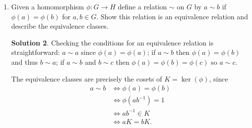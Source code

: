 \documentclass{article}
\theoremstyle{definition}
\newtheorem*{solution}{Solution}
\begin{document}
\begin{enumerate}
\begin{solution}
It is also a homomorphism, since 
\begin{align*}
\bar{\phi}((gH_1)(g'H_1)) &= \bar{\phi}(gg'H_1) \\
&= \phi(gg')H_2 \\
&= \phi(g)\phi(g')H_2 \\
&= (\phi(g)H_2)(\phi(g')H_2) \\
&= \bar{\phi}(gH_1) \bar{\phi}(g'H_1).
\end{align*}
\end{solution}
\item[11.19.] Given a homomorphism $\phi : G \to H$ define a relation $\sim$ on $G$ by $a \sim b$ if $\phi(a) = \phi(b)$ for $a, b \in G$.  Show this relation is an equivalence relation and describe the equivalence classes.
\begin{solution}
Checking the conditions for an equivalence relation is straightforward: $a \sim a$ since $\phi(a) = \phi(a)$; if $a \sim b$ then $\phi(a) = \phi(b)$ and thus $b \sim a$; if $a \sim b$ and $b \sim c$ then $\phi(a) = \phi(b) = \phi(c)$ so $a \sim c$.

The equivalence classes are precisely the cosets of $K = \ker(\phi)$, since
\begin{align*}
a \sim b &\Leftrightarrow \phi(a) = \phi(b) \\
&\Leftrightarrow \phi(ab^{-1}) = 1 \\
&\Leftrightarrow ab^{-1} \in K \\
&\Leftrightarrow aK = bK.
\end{align*}
\end{solution}
\end{enumerate}
\end{document}
